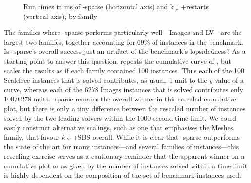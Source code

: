 \begin{figure}[htb]
    \caption{Run times in ms of \McSplit-sparse (horizontal axis) and k$\downarrow$+restarts (vertical axis), by family.}
    \label{figure:mcsplit-sparse-scatter-by-family}
\end{figure}

The families where \McSplit-sparse performs particularly well---Images and LV---are
the largest two families, together accounting for 69\% of instances in the benchmark.
Is \McSplit-sparse's overall success just an artifact of the benchmark's
lopsidedness?  As a starting point to answer this question,
repeats the cumulative curve of
, but scales the results as if each family
contained 100 instances.  Thus each
of the 100 Scalefree instances that is solved contributes, as usual, 1 unit to the
$y$ value of a curve, whereas each of the 6278 Images instances that is solved
contributes only $100/6278$ units.
\McSplit-sparse remains the overall winner in this rescaled cumulative plot,
but there is only a tiny difference between the rescaled number of instances
solved by the two leading solvers within the 1000 second time limit.
We could easily construct alternative scalings, such as one that emphasises
the Meshes family, that favour $k\downarrow$+SBS overall.
While it is clear that \McSplit-sparse outperforms the state of the art
for many instances---and several families of instances---this rescaling
exercise serves as a cautionary reminder that the apparent winner
on a cumulative plot or as given by the number of instances solved within
a time limit is highly dependent on the composition of the set of
benchmark instances used.

